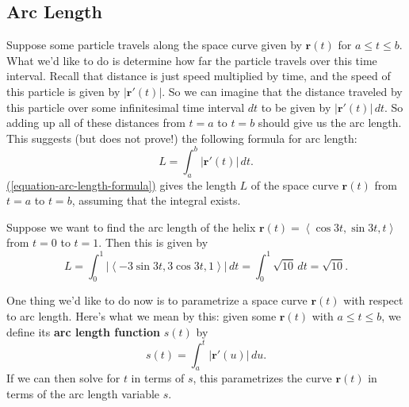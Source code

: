 \documentclass[10pt,]{book}
\newcommand{\terminology}[1]{\textbf{#1}}
\theoremstyle{ptxplainnotitle}
\theoremstyle{ptxplaintitle}
\theoremstyle{ptxplainnotitle}
\theoremstyle{ptxplaintitle}
\theoremstyle{ptxplainnotitle}
\theoremstyle{ptxplaintitle}
\theoremstyle{ptxdefinitionnotitle}
\theoremstyle{ptxdefinitiontitle}
\theoremstyle{ptxdefinitionnotitle}
\theoremstyle{ptxdefinitiontitle}
\theoremstyle{ptxdefinitionnotitle}
\theoremstyle{ptxdefinitiontitle}
\theoremstyle{ptxdefinitionnotitle}
\theoremstyle{ptxdefinitiontitle}
\theoremstyle{ptxdefinitionnotitle}
\theoremstyle{ptxdefinitiontitle}
\numberwithin{equation}{section}
\newcommand{\vv}[1]{\mathbf{#1}}
\newcommand{\dotprod}[1]{\left\langle #1 \right\rangle}
\begin{document}
\subsection[{Arc Length}]{Arc Length}\label{subsection-arc-length}
\hypertarget{p-933}{}%
Suppose some particle travels along the space curve given by \(\vv{r}(t)\) for \(a\leq t\leq b\). What we'd like to do is determine how far the particle travels over this time interval. Recall that distance is just speed multiplied by time, and the speed of this particle is given by \(|\vv{r}'(t)|\). So we can imagine that the distance traveled by this particle over some infinitesimal time interval \(dt\) to be given by \(|\vv{r}'(t)|\,dt\). So adding up all of these distances from \(t=a\) to \(t=b\) should give us the arc length. This suggests (but does not prove!) the following formula for arc length:%
%
\begin{equation}
L = \int_{a}^{b}|\vv{r}'(t)|\,dt.\label{equation-arc-length-formula}
\end{equation}
\hypertarget{p-934}{}%
\hyperref[equation-arc-length-formula]{(\ref{equation-arc-length-formula})} gives the length \(L\) of the space curve \(\vv{r}(t)\) from \(t=a\) to \(t=b\), assuming that the integral exists.%
\begin{example}\label{example-arc-length-of-a-helix}
\hypertarget{p-935}{}%
Suppose we want to find the arc length of the helix \(\vv{r}(t) = \dotprod{\cos 3t,\sin 3t, t}\) from \(t=0\) to \(t=1\). Then this is given by%
%
\begin{equation*}
L = \int_{0}^{1}|\dotprod{-3\sin3t, 3\cos3t, 1}|\,dt = \int_{0}^{1}\sqrt{10}\,dt = \sqrt{10}.
\end{equation*}
\end{example}
\hypertarget{p-936}{}%
One thing we'd like to do now is to parametrize a space curve \(\vv{r}(t)\) with respect to arc length. Here's what we mean by this: given some \(\vv{r}(t)\) with \(a\leq t\leq b\), we define its \terminology{arc length function} \(s(t)\) by%
%
\begin{equation*}
s(t) = \int_{a}^{t}|\vv{r}'(u)|\,du.
\end{equation*}
\hypertarget{p-937}{}%
If we can then solve for \(t\) in terms of \(s\), this parametrizes the curve \(\vv{r}(t)\) in terms of the arc length variable \(s\).%
\end{document}
